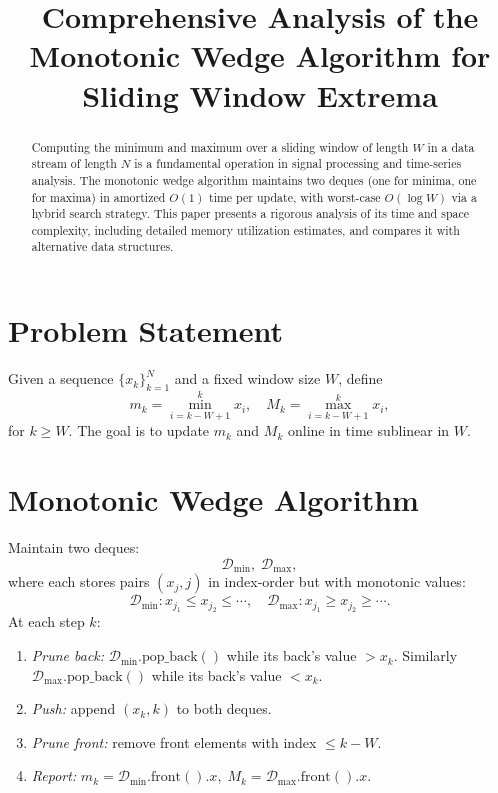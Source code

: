 \documentclass[12pt]{article}
\title{Comprehensive Analysis of the Monotonic Wedge Algorithm for Sliding Window Extrema}
\date{}
\begin{document}
\maketitle

\begin{abstract}
Computing the minimum and maximum over a sliding window of length \(W\) in a data stream of length \(N\) is a fundamental operation in signal processing and time-series analysis.  The monotonic wedge algorithm maintains two deques (one for minima, one for maxima) in amortized \(O(1)\) time per update, with worst-case \(O(\log W)\) via a hybrid search strategy.  This paper presents a rigorous analysis of its time and space complexity, including detailed memory utilization estimates, and compares it with alternative data structures.
\end{abstract}

\section{Problem Statement}
Given a sequence \(\{x_k\}_{k=1}^N\) and a fixed window size \(W\), define
\[
m_k = \min_{i=k-W+1}^k x_i,
\quad
M_k = \max_{i=k-W+1}^k x_i,
\]
for \(k\ge W\).  The goal is to update \(m_k\) and \(M_k\) online in time sublinear in \(W\).

\section{Monotonic Wedge Algorithm}
Maintain two deques:
\[
\mathcal{D}_{\min},\;\mathcal{D}_{\max},
\]
where each stores pairs \((x_j,j)\) in index‐order but with monotonic values:
\[
\mathcal{D}_{\min}: x_{j_1}\le x_{j_2}\le\cdots,
\quad
\mathcal{D}_{\max}: x_{j_1}\ge x_{j_2}\ge\cdots.
\]
At each step \(k\):
\begin{enumerate}
  \item \emph{Prune back:}
    \(\mathcal{D}_{\min}.\mathrm{pop\_back}()\) while its back’s value \(>x_k\).
    Similarly \(\mathcal{D}_{\max}.\mathrm{pop\_back}()\) while its back’s value \(<x_k\).
  \item \emph{Push:} append \((x_k,k)\) to both deques.
  \item \emph{Prune front:} remove front elements with index \(\le k-W\).
  \item \emph{Report:}  
    \(m_k=\mathcal{D}_{\min}.\mathrm{front}().x,\;M_k=\mathcal{D}_{\max}.\mathrm{front}().x.\)
\end{enumerate}
\end{document}
